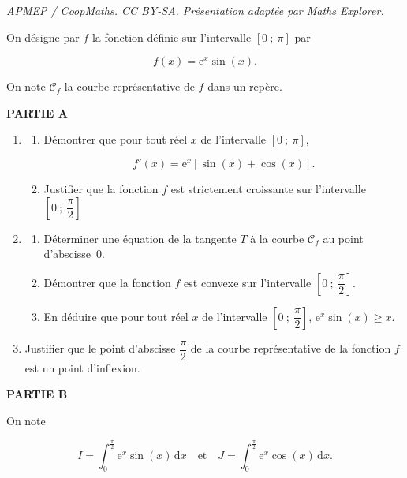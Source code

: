 \documentclass[10pt]{article}
\providecommand{\e}{{\mathrm{e}}}
\begin{document}
\noindent\textit{APMEP / CoopMaths. CC BY-SA. Présentation adaptée par Maths Explorer.}\par\medskip
\medskip

On désigne par $f$ la fonction définie sur l'intervalle $[0~;~\pi]$ par

\[f(x) = \e^x \sin (x).\]

On note $\mathcal{C}_f$ la courbe représentative de $f$ dans un repère.

\bigskip

\textbf{PARTIE A}

\medskip

\begin{enumerate}
\item
	\begin{enumerate}
		\item Démontrer que pour tout réel $x$ de l'intervalle $[0~;~\pi]$,\:

\[f'(x) = \e^x[\sin(x) + \cos(x)].\]

		\item Justifier que la fonction $f$ est strictement croissante sur l'intervalle 
$\left[0~;~\dfrac{\pi}{2}\right]$
	\end{enumerate}
\item
	\begin{enumerate}
		\item Déterminer une équation de la tangente $T$ à la courbe $\mathcal{C}_f$ au point d'abscisse~$0$.
		\item Démontrer que la fonction $f$ est convexe sur l'intervalle $\left[0~;~\dfrac{\pi}{2}\right]$.
		\item En déduire que pour tout réel $x$ de l'intervalle $\left[0~;~\dfrac{\pi}{2}\right]$,\: $\e^x \sin (x) \geqslant x$.
	\end{enumerate}
\item Justifier que le point d'abscisse $\dfrac{\pi}{2}$ de la courbe représentative de la fonction $f$ est un point d'inflexion.
\end{enumerate}

\bigskip

\textbf{PARTIE B}

\medskip


On note

\[I = \displaystyle\int_0^{\frac{\pi}{2}} \e^x \sin (x)\, \text{d}x\quad  \text{et}\quad J = \displaystyle\int_0^{\frac{\pi}{2}} \e^x \cos (x)\, \text{d}x.\]

\smallskip
\end{document}
